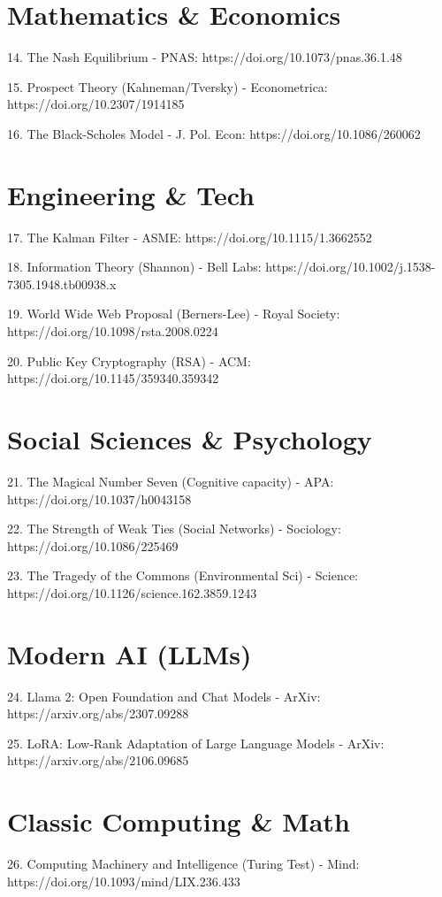 \documentclass[12pt]{article}
\begin{document}
\section{Mathematics \& Economics}
14. The Nash Equilibrium - PNAS:
https://doi.org/10.1073/pnas.36.1.48

15. Prospect Theory (Kahneman/Tversky) - Econometrica:
https://doi.org/10.2307/1914185

16. The Black-Scholes Model - J. Pol. Econ:
https://doi.org/10.1086/260062

\section{Engineering \& Tech}
17. The Kalman Filter - ASME:
https://doi.org/10.1115/1.3662552

18. Information Theory (Shannon) - Bell Labs:
https://doi.org/10.1002/j.1538-7305.1948.tb00938.x

19. World Wide Web Proposal (Berners-Lee) - Royal Society:
https://doi.org/10.1098/rsta.2008.0224

20. Public Key Cryptography (RSA) - ACM:
https://doi.org/10.1145/359340.359342

\section{Social Sciences \& Psychology}
21. The Magical Number Seven (Cognitive capacity) - APA:
https://doi.org/10.1037/h0043158

22. The Strength of Weak Ties (Social Networks) - Sociology:
https://doi.org/10.1086/225469

23. The Tragedy of the Commons (Environmental Sci) - Science:
https://doi.org/10.1126/science.162.3859.1243

\section{Modern AI (LLMs)}
24. Llama 2: Open Foundation and Chat Models - ArXiv:
https://arxiv.org/abs/2307.09288

25. LoRA: Low-Rank Adaptation of Large Language Models - ArXiv:
https://arxiv.org/abs/2106.09685

\section{Classic Computing \& Math}
26. Computing Machinery and Intelligence (Turing Test) - Mind:
https://doi.org/10.1093/mind/LIX.236.433
\end{document}
